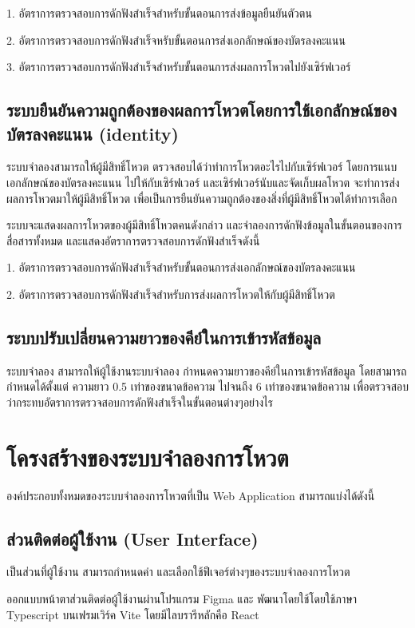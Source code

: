 1. อัตราการตรวจสอบการดักฟังสำเร็จสำหรับขั้นตอนการส่งข้อมูลยืนยันตัวตน 

2. อัตราการตรวจสอบการดักฟังสำเร็จหรับขั้นตอนการส่งเอกลักษณ์ของบัตรลงคะแนน

3. อัตราการตรวจสอบการดักฟังสำเร็จสำหรับขั้นตอนการส่งผลการโหวตไปยังเซิร์ฟเวอร์

\subsection{ระบบยืนยันความถูกต้องของผลการโหวตโดยการใช้เอกลักษณ์ของบัตรลงคะแนน (identity)}
  ระบบจำลองสามารถให้ผู้มีสิทธิ์โหวต ตรวจสอบได้ว่าทำการโหวตอะไรไปกับเซิร์ฟเวอร์ โดยการแนบเอกลักษณ์ของบัตรลงคะแนน
ไปให้กับเซิร์ฟเวอร์ และเซิร์ฟเวอร์นับและจัดเก็บผลโหวต จะทำการส่งผลการโหวตมาให้ผู้มีสิทธิ์โหวต เพื่อเป็นการยืนยันความถูกต้องของสิ่งที่ผู้มีสิทธิ์โหวตได้ทำการเลือก

  ระบบจะแสดงผลการโหวตของผู้มีสิทธิ์โหวตคนดังกล่าว และจำลองการดักฟังข้อมูลในขั้นตอนของการสื่อสารทั้งหมด
และแสดงอัตราการตรวจสอบการดักฟังสำเร็จดังนี้

1. อัตราการตรวจสอบการดักฟังสำเร็จสำหรับขั้นตอนการส่งเอกลักษณ์ของบัตรลงคะแนน

2. อัตราการตรวจสอบการดักฟังสำเร็จสำหรับการส่งผลการโหวตให้กับผู้มีสิทธิ์โหวต

\subsection{ระบบปรับเปลี่ยนความยาวของคีย์ในการเข้ารหัสข้อมูล}
  ระบบจำลอง สามารถให้ผู้ใช้งานระบบจำลอง กำหนดความยาวของคีย์ในการเข้ารหัสข้อมูล โดยสามารถกำหนดได้ตั้งแต่
ความยาว 0.5 เท่าของขนาดข้อความ ไปจนถึง 6 เท่าของขนาดข้อความ เพื่อตรวจสอบว่ากระทบอัตราการตรวจสอบการดักฟังสำเร็จในขั้นตอนต่างๆอย่างไร


\section{โครงสร้างของระบบจำลองการโหวต}
องค์ประกอบทั้งหมดของระบบจำลองการโหวตที่เป็น Web Application สามารถแบ่งได้ดังนี้

\subsection{ส่วนติดต่อผู้ใช้งาน (User Interface)}
เป็นส่วนที่ผู้ใช้งาน สามารถกำหนดค่า และเลือกใช้ฟีเจอร์ต่างๆของระบบจำลองการโหวต

ออกแบบหน้าตาส่วนติดต่อผู้ใช้งานผ่านโปรแกรม Figma และ
พัฒนาโดยใช้โดยใช้ภาษา Typescript บนเฟรมเวิร์ค Vite โดยมีไลบรารีหลักคือ React

